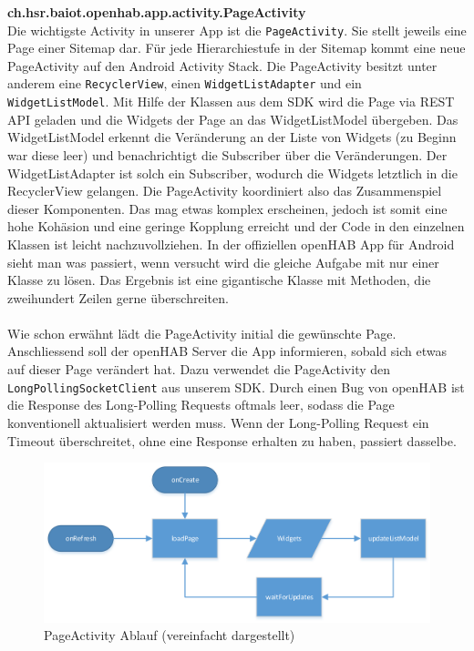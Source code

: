 \textbf{ch.hsr.baiot.openhab.app.activity.PageActivity}\\
Die wichtigste Activity in unserer App ist die \lstinline!PageActivity!. Sie stellt jeweils eine Page einer Sitemap dar. Für jede Hierarchiestufe in der Sitemap kommt eine neue PageActivity auf den Android Activity Stack. Die PageActivity besitzt unter anderem eine \lstinline!RecyclerView!, einen \lstinline!WidgetListAdapter! und ein \lstinline!WidgetListModel!. Mit Hilfe der Klassen aus dem SDK wird die Page via REST API geladen und die Widgets der Page an das WidgetListModel übergeben. Das WidgetListModel erkennt die Veränderung an der Liste von Widgets (zu Beginn war diese leer) und benachrichtigt die Subscriber über die Veränderungen. Der WidgetListAdapter ist solch ein Subscriber, wodurch die Widgets letztlich in die RecyclerView gelangen. Die PageActivity koordiniert also das Zusammenspiel dieser Komponenten. Das mag etwas komplex erscheinen, jedoch ist somit eine hohe Kohäsion und eine geringe Kopplung erreicht und der Code in den einzelnen Klassen ist leicht nachzuvollziehen. In der offiziellen openHAB App für Android sieht man was passiert, wenn versucht wird die gleiche Aufgabe mit nur einer Klasse zu lösen. Das Ergebnis ist eine gigantische Klasse mit Methoden, die zweihundert Zeilen gerne überschreiten.\\ \\
Wie schon erwähnt lädt die PageActivity initial die gewünschte Page. Anschliessend soll der openHAB Server die App informieren, sobald sich etwas auf dieser Page verändert hat. Dazu verwendet die PageActivity den \lstinline!LongPollingSocketClient! aus unserem SDK. Durch einen Bug von openHAB ist die Response des Long-Polling Requests oftmals leer, sodass die Page konventionell aktualisiert werden muss. Wenn der Long-Polling Request ein Timeout überschreitet, ohne eine Response erhalten zu haben, passiert dasselbe.

\begin{figure}[H]
	\centering
		\includegraphics[width=\textwidth]{report/img/page_activity.png}
	\caption{PageActivity Ablauf (vereinfacht dargestellt)}
	\label{fig:pageActivityWorkflow}
\end{figure}

